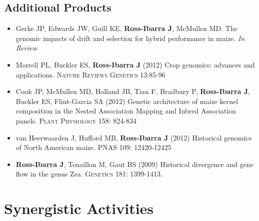 \documentclass[11pt]{article}
\begin{document}
\subsection*{Additional Products}

\begin{itemize} \setlength{\itemsep}{0pt} \setlength{\parskip}{2pt} \setlength{\parsep}{0pt}

\item Gerke JP, Edwards JW, Guill KE, {\bf Ross-Ibarra J}, McMullen MD.  The genomic impacts of drift and selection for hybrid performance in maize. \emph{In Review}

\item Morrell PL, Buckler ES, {\bf Ross-Ibarra J} (2012) Crop genomics: advances and applications.  \textsc{Nature Reviews Genetics} 13:85-96

\item Cook JP, McMullen MD, Holland JB, Tian F, Bradbury P, {\bf Ross-Ibarra J}, Buckler ES, Flint-Garcia SA (2012) Genetic architecture of maize kernel composition in the Nested Association Mapping and Inbred Association panels.  \textsc{Plant Physiology} 158: 824-834

\item van Heerwaarden J, Hufford MB, {\bf Ross-Ibarra J} (2012) Historical genomics of North American maize. \textsc{PNAS} 109: 12420-12425

\item {\bf Ross-Ibarra J}, Tenaillon M, Gaut BS (2009) Historical divergence and gene flow in the genus Zea.  \textsc{Genetics} 181: 1399-1413.

\end{itemize}

\section{Synergistic Activities}
\end{document}
